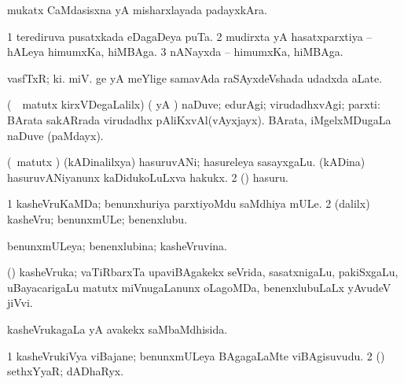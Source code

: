\bentry
{} 
\gl{\nA}
\expl{\F\ }
\bmng
 mukatx CaMdasisxna yA misharxlayada padayxkAra. 
\emng
\eentry

\bentry
{} 
\gl{\nA}
\bmng
\bnum
\num{1} terediruva pusatxkada eDagaDeya puTa. 
\num{2} mudirxta yA hasatxparxtiya -- hALeya himumxKa, hiMBAga. 
\num{3} nANayxda -- himumxKa, hiMBAga. 
\enum
\emng
\eentry

\bentry
{} 
\gl{\nA}
\expl{}
\bmng
 vasfTxR;  ki. miV. ge yA  meYlige samavAda raSAyxdeVshada udadxda aLate. 
\emng
\eentry

\bentry
{} 
\gl{\upa}
\expl{}
\bmng
 (\kanmu\ \nAyxshA\ matutx kirxVDegaLalilx) (\saMkiSx {} yA ) naDuve; edurAgi; virudadhxvAgi; parxti:  BArata sakARrada virudadhx pAliKxvAl(vAyxjayx).  BArata, iMgelxMDugaLa naDuve (paMdayx). 
\emng
\eentry

\bentry
{} 
\gl{\nA}
\expl{}
\bmng
\bnum
{} (\nAyxshA\ matutx \ca) 
\banum
{} (kADinalilxya) hasuruvANi; hasureleya sasayxgaLu. 
 (kADina) hasuruvANiyanunx kaDidukoLuLxva hakukx. 
\eanum
\numie
\num{2} (\vaMlAM) hasuru. 
\enum
\emng
\eentry

\bentry
{} 
\gl{\nA}
\bmng
\bnum
\num{1} kasheVruKaMDa; benunxhuriya parxtiyoMdu saMdhiya mULe. 
\num{2} (\bava dalilx) kasheVru; benunxmULe; benenxlubu. 
\enum
\emng
\eentry

\bentry
{} 
\gl{\gu}
\expl{}
\bmng
 benunxmULeya; benenxlubina; kasheVruvina. 
\emng
\eentry

\bentry
{} 
\gl{\nA}
\expl{}
\bmng
 (\pArxvi) kasheVruka; vaTiRbarxTa upaviBAgakekx seVrida, sasatxnigaLu, pakiSxgaLu, uBayacarigaLu matutx miVnugaLanunx oLagoMDa, benenxlubuLaLx yAvudeV jiVvi. 
\emng
\eentry

\bentry
{} 
\gl{\gu}
\expl{}
\bmng
 kasheVrukagaLa yA avakekx saMbaMdhisida. 
\emng
\eentry

\bentry 
{} 
\gl{\nA}
\expl{}
\bmng
\bnum
\num{1} kasheVrukiVya viBajane; benunxmULeya BAgagaLaMte viBAgisuvudu. 
\num{2} (\rUpa) sethxYyaR; dADhaRyx. 
\enum
\emng
\eentry


